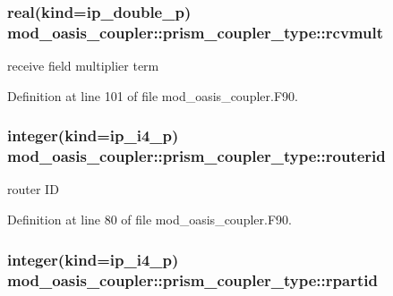 \hypertarget{structmod__oasis__coupler_1_1prism__coupler__type_a9733b71cc0ade029f7f19be6ad114596}{
\subsubsection[{rcvmult}]{\setlength{\rightskip}{0pt plus 5cm}real(kind=ip\+\_\+double\+\_\+p) mod\+\_\+oasis\+\_\+coupler\+::prism\+\_\+coupler\+\_\+type\+::rcvmult\hspace{0.3cm}{\ttfamily [private]}}}\label{structmod__oasis__coupler_1_1prism__coupler__type_a9733b71cc0ade029f7f19be6ad114596}


receive field multiplier term 



Definition at line 101 of file mod\+\_\+oasis\+\_\+coupler.\+F90.

\hypertarget{structmod__oasis__coupler_1_1prism__coupler__type_ab6ce21d836e3fc511fcb028f99b0abd7}{
\subsubsection[{routerid}]{\setlength{\rightskip}{0pt plus 5cm}integer(kind=ip\+\_\+i4\+\_\+p) mod\+\_\+oasis\+\_\+coupler\+::prism\+\_\+coupler\+\_\+type\+::routerid\hspace{0.3cm}{\ttfamily [private]}}}\label{structmod__oasis__coupler_1_1prism__coupler__type_ab6ce21d836e3fc511fcb028f99b0abd7}


router I\+D 



Definition at line 80 of file mod\+\_\+oasis\+\_\+coupler.\+F90.

\hypertarget{structmod__oasis__coupler_1_1prism__coupler__type_a1bf4a986a745318b93d46612b95b0489}{
\subsubsection[{rpartid}]{\setlength{\rightskip}{0pt plus 5cm}integer(kind=ip\+\_\+i4\+\_\+p) mod\+\_\+oasis\+\_\+coupler\+::prism\+\_\+coupler\+\_\+type\+::rpartid\hspace{0.3cm}{\ttfamily [private]}}}\label{structmod__oasis__coupler_1_1prism__coupler__type_a1bf4a986a745318b93d46612b95b0489}



